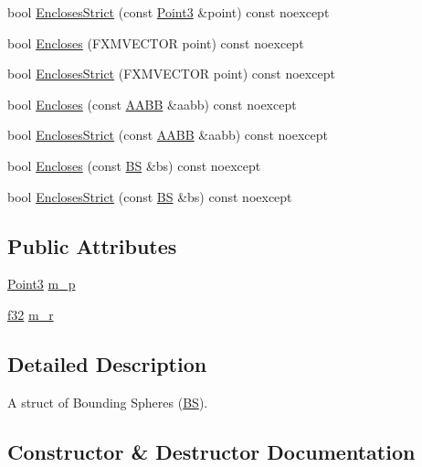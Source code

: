 \begin{DoxyCompactItemize}
\item 
bool \hyperlink{structmage_1_1_b_s_adcbd276fc5ecb48367b83da5a42defd4}{Encloses\+Strict} (const \hyperlink{structmage_1_1_point3}{Point3} \&point) const noexcept
\item 
bool \hyperlink{structmage_1_1_b_s_a4f312c5d09aaa97dd85702713ad26d07}{Encloses} (F\+X\+M\+V\+E\+C\+T\+OR point) const noexcept
\item 
bool \hyperlink{structmage_1_1_b_s_abe3c13f8a9aa74199b38eff5bb3fd141}{Encloses\+Strict} (F\+X\+M\+V\+E\+C\+T\+OR point) const noexcept
\item 
bool \hyperlink{structmage_1_1_b_s_ac646d715cc59c4ac7c324696fbf00ba8}{Encloses} (const \hyperlink{structmage_1_1_a_a_b_b}{A\+A\+BB} \&aabb) const noexcept
\item 
bool \hyperlink{structmage_1_1_b_s_a5172470cadb43af2015e351ab6d4e8b6}{Encloses\+Strict} (const \hyperlink{structmage_1_1_a_a_b_b}{A\+A\+BB} \&aabb) const noexcept
\item 
bool \hyperlink{structmage_1_1_b_s_a31ae3c4759efcdf7e101cae3a702dc00}{Encloses} (const \hyperlink{structmage_1_1_b_s}{BS} \&bs) const noexcept
\item 
bool \hyperlink{structmage_1_1_b_s_ab0692e25e9cfe45eb3c6003f5fc8de9f}{Encloses\+Strict} (const \hyperlink{structmage_1_1_b_s}{BS} \&bs) const noexcept
\end{DoxyCompactItemize}
\subsection*{Public Attributes}
\begin{DoxyCompactItemize}
\item 
\hyperlink{structmage_1_1_point3}{Point3} \hyperlink{structmage_1_1_b_s_a6d63fae8fd20d26587ebd11efb1789d2}{m\+\_\+p}
\item 
\hyperlink{namespacemage_a6a44ad388483959dc4dff9f2aef91431}{f32} \hyperlink{structmage_1_1_b_s_a63a16fbfb4ff89697db2c0a8f976a3ce}{m\+\_\+r}
\end{DoxyCompactItemize}


\subsection{Detailed Description}
A struct of Bounding Spheres (\hyperlink{structmage_1_1_b_s}{BS}). 

\subsection{Constructor \& Destructor Documentation}
\hypertarget{structmage_1_1_b_s_aa34921d9ea23b9a724ddf739b3adabfa}{}\label{structmage_1_1_b_s_aa34921d9ea23b9a724ddf739b3adabfa} 
